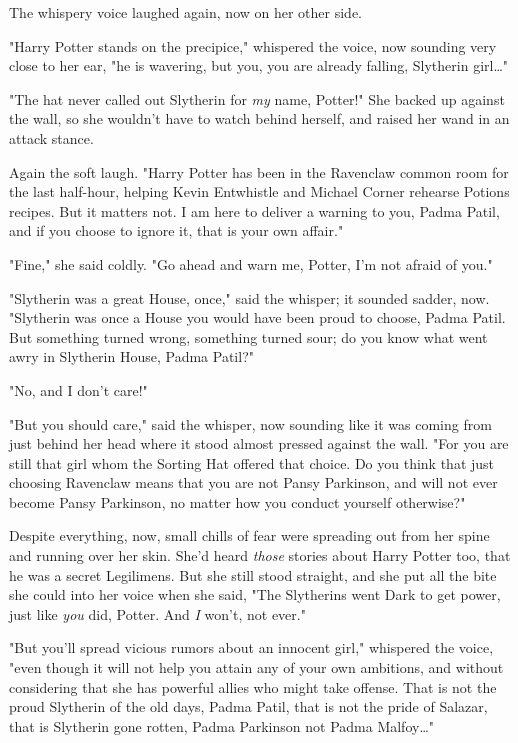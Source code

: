 The whispery voice laughed again, now on her other side.

"Harry Potter stands on the precipice," whispered the voice, now sounding very 
close to her ear, "he is wavering, but you, you are already falling, Slytherin 
girl{\ldots}"

"The hat never called out Slytherin for \emph{my} name, Potter!" She backed up 
against the wall, so she wouldn't have to watch behind herself, and raised her 
wand in an attack stance.

Again the soft laugh. "Harry Potter has been in the Ravenclaw common room for 
the last half-hour, helping Kevin Entwhistle and Michael Corner rehearse 
Potions recipes. But it matters not. I am here to deliver a warning to you, 
Padma Patil, and if you choose to ignore it, that is your own affair."

"Fine," she said coldly. "Go ahead and warn me, Potter, I'm not afraid of you."

"Slytherin was a great House, once," said the whisper; it sounded sadder, now. 
"Slytherin was once a House you would have been proud to choose, Padma Patil. 
But something turned wrong, something turned sour; do you know what went awry 
in Slytherin House, Padma Patil?"

"No, and I don't care!"

"But you should care," said the whisper, now sounding like it was coming from 
just behind her head where it stood almost pressed against the wall. "For you 
are still that girl whom the Sorting Hat offered that choice. Do you think that 
just choosing Ravenclaw means that you are not Pansy Parkinson, and will not 
ever become Pansy Parkinson, no matter how you conduct yourself otherwise?"

Despite everything, now, small chills of fear were spreading out from her spine 
and running over her skin. She'd heard \emph{those} stories about Harry Potter 
too, that he was a secret Legilimens. But she still stood straight, and she put 
all the bite she could into her voice when she said, "The Slytherins went Dark 
to get power, just like \emph{you} did, Potter. And \emph{I} won't, not ever."

"But you'll spread vicious rumors about an innocent girl," whispered the voice, 
"even though it will not help you attain any of your own ambitions, and without 
considering that she has powerful allies who might take offense. That is not 
the proud Slytherin of the old days, Padma Patil, that is not the pride of 
Salazar, that is Slytherin gone rotten, Padma Parkinson not Padma 
Malfoy{\ldots}"

